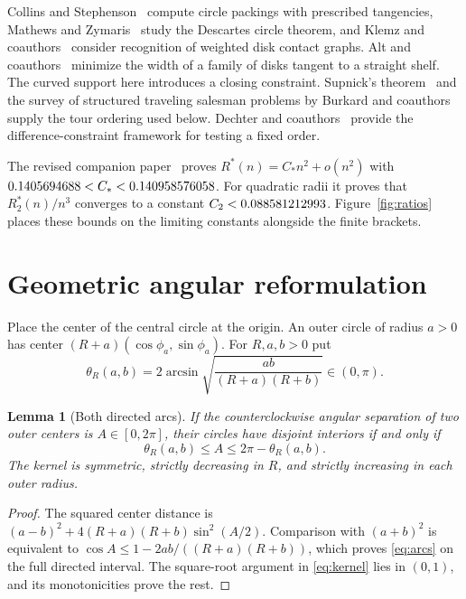 \documentclass[11pt]{article}
\newtheorem{lemma}[theorem]{Lemma}
\theoremstyle{definition}
\theoremstyle{remark}
\newcommand{\Rstar}{R^*}
\begin{document}
Collins and Stephenson~\cite{collins-stephenson} compute circle packings
with prescribed tangencies, Mathews and Zymaris~\cite{mathews-zymaris}
study the Descartes circle theorem, and Klemz and coauthors~\cite{klemz}
consider recognition of weighted disk contact graphs. Alt and
coauthors~\cite{alt} minimize the width of a family of disks tangent to a
straight shelf. The curved support here introduces a closing constraint.
Supnick's theorem~\cite{supnick} and the survey of structured traveling
salesman problems by Burkard and coauthors~\cite{survey} supply the tour
ordering used below. Dechter and coauthors~\cite{stn} provide the
difference-constraint framework for testing a fixed order.

The revised companion paper~\cite{paper-ii} proves
$\Rstar(n)=C_*n^2+o(n^2)$ with $0.1405694688<C_*<0.140958576058$.
For quadratic radii it proves that $R_2^*(n)/n^3$ converges to a constant
$C_2<0.088581212993$. Figure~\ref{fig:ratios} places these bounds on the
limiting constants alongside the finite brackets.

\section{Geometric angular reformulation}\label{sec:geometry}
Place the center of the central circle at the origin. An outer circle
of radius $a>0$
has center $(R+a)(\cos\phi_a,\sin\phi_a)$. For $R,a,b>0$ put
\begin{equation}\label{eq:kernel}
 \theta_R(a,b)=2\arcsin\sqrt{\frac{ab}{(R+a)(R+b)}}\in(0,\pi).
\end{equation}
\begin{lemma}[Both directed arcs]\label{lem:angular}
If the counterclockwise angular separation of two outer centers is
$A\in[0,2\pi]$, their circles have disjoint interiors if and only if
\begin{equation}\label{eq:arcs}
 \theta_R(a,b)\le A\le2\pi-\theta_R(a,b).
\end{equation}
The kernel is symmetric, strictly decreasing in $R$, and strictly increasing
in each outer radius.
\end{lemma}
\begin{proof}
The squared center distance is
$(a-b)^2+4(R+a)(R+b)\sin^2(A/2)$. Comparison with $(a+b)^2$
is equivalent to $\cos A\le1-2ab/((R+a)(R+b))$, which proves
\eqref{eq:arcs} on the full directed interval. The square-root argument in
\eqref{eq:kernel} lies in $(0,1)$, and its monotonicities prove the rest.
\end{proof}
\end{document}
